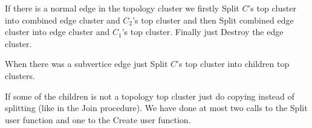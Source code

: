 If there is a normal edge in the topology cluster we firstly Split $C$'s
{\I top cluster} into {\I combined edge cluster} and $C_2$'s {\I top cluster}
and then Split {\I combined edge cluster} into {\I edge cluster} and $C_1$'s
{\I top cluster}. Finally just Destroy the {\I edge cluster}.

When there was a subvertice edge just Split $C$'s {\I top cluster} into children
{\I top clusters}.

If some of the children is not a topology top cluster just do copying instead of
splitting (like in the Join procedure). We have done at most two calls to the
Split user function and one to the Create user function.
